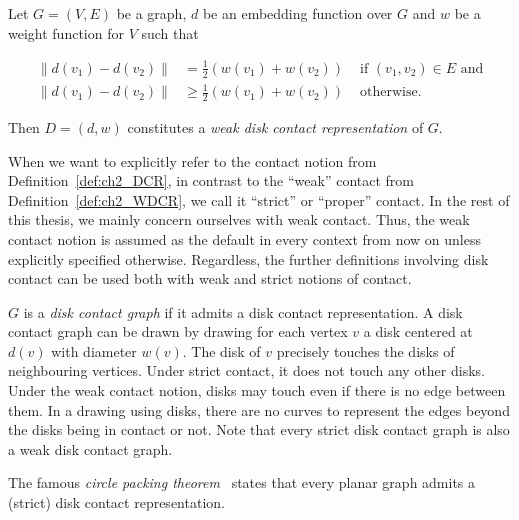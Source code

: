\begin{definition}
\label{def:ch2_WDCR}
Let $G = (V, E)$ be a graph, $d$ be an embedding function over $G$ and $w$ be a weight function for $V$ such that

\begin{align*}
\lVert d(v_1) - d(v_2) \rVert &= \frac12(w(v_1) + w(v_2)) &\text{ if } (v_1, v_2) \in E \text{ and} \\ \lVert d(v_1) - d(v_2) \rVert &\ge \frac12(w(v_1) + w(v_2)) &\text{ otherwise.}
\end{align*}

Then $D = (d, w)$ constitutes a \emph{weak disk contact representation} of $G$.
\end{definition}

When we want to explicitly refer to the contact notion from Definition~\ref{def:ch2_DCR}, in contrast to the ``weak'' contact from Definition~\ref{def:ch2_WDCR}, we call it ``strict'' or ``proper'' contact. In the rest of this thesis, we mainly concern ourselves with weak contact. Thus, the weak contact notion is assumed as the default in every context from now on unless explicitly specified otherwise. Regardless, the further definitions involving disk contact can be used both with weak and strict notions of contact.

$G$ is a \emph{disk contact graph} if it admits a disk contact representation. A disk contact graph can be drawn by drawing for each vertex $v$ a disk centered at $d(v)$ with diameter $w(v)$. The disk of $v$ precisely touches the disks of neighbouring vertices. Under strict contact, it does not touch any other disks. Under the weak contact notion, disks may touch even if there is no edge between them. In a drawing using disks, there are no curves to represent the edges beyond the disks being in contact or not. Note that every strict disk contact graph is also a weak disk contact graph.


The famous \emph{circle packing theorem}~\cite{Koebe1936} states that every planar graph admits a (strict) disk contact representation.

